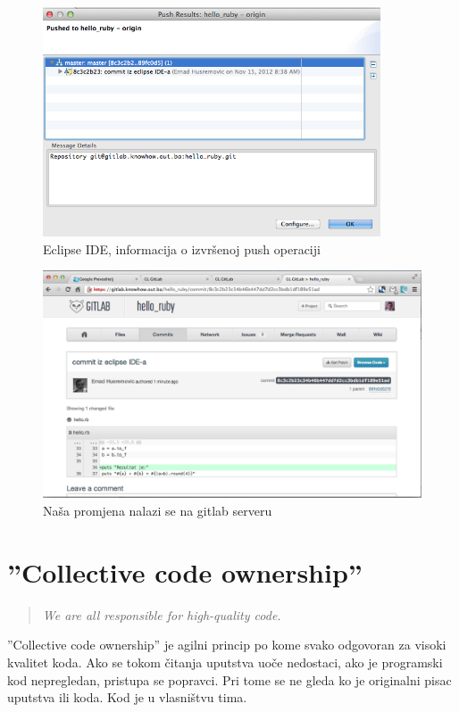 \documentclass[times, utf8, seminar]{fit}
\begin{document}
\begin{itemize}
\begin{figure}[H]
\centering
\includegraphics[width=10cm]{img/eclipse_git_05.png}
\caption{Eclipse IDE, informacija o izvršenoj push operaciji}
\end{figure}

\begin{figure}[H]
\centering
\includegraphics[width=15cm]{img/eclipse_git_06.png}
\caption{Naša promjena nalazi se na gitlab serveru}
\end{figure}

\section{''Collective code ownership''}

\begin{quotation}
  \emph{We are all responsible for high-quality code.}
\end{quotation}

''Collective code ownership''\citep[str. ]{agileart} je agilni princip po kome svako odgovoran za visoki kvalitet koda.
Ako se tokom čitanja uputstva uoče nedostaci, ako je programski kod nepregledan, pristupa se popravci.
Pri tome se ne gleda ko je originalni pisac uputstva ili koda. Kod je u vlasništvu tima.


\end{itemize}
\end{document}
